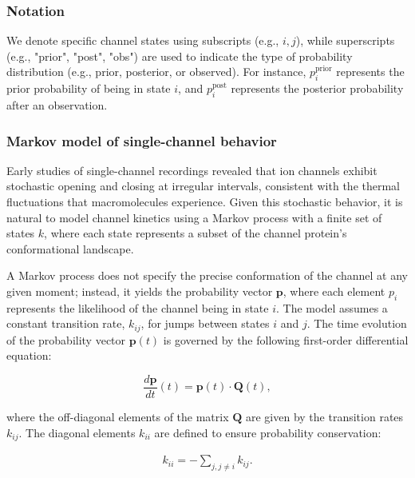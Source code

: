 \documentclass[pdflatex,sn-mathphys-num]{sn-jnl}%
\theoremstyle{thmstyleone}%
\theoremstyle{thmstyletwo}%
\theoremstyle{thmstylethree}%
\begin{document}
\subsubsection{Notation}
We denote specific channel states using subscripts (e.g., \( i, j \)), while superscripts (e.g., "prior", "post", "obs") are used to indicate the type of probability distribution (e.g., prior, posterior, or observed). For instance, \( p_i^{\text{prior}} \) represents the prior probability of being in state \( i \), and \( p_i^{\text{post}} \) represents the posterior probability after an observation.

\subsubsection{Markov model of single-channel behavior}

Early studies of single-channel recordings revealed that ion channels exhibit stochastic opening and closing at irregular intervals, consistent with the thermal fluctuations that macromolecules experience. Given this stochastic behavior, it is natural to model channel kinetics using a Markov process with a finite set of states \( k \), where each state represents a subset of the channel protein’s conformational landscape. 

A Markov process does not specify the precise conformation of the channel at any given moment; instead, it yields the probability vector \( \boldsymbol{p} \), where each element \( p_i \) represents the likelihood of the channel being in state \( i \). The model assumes a constant transition rate, \( k_{ij} \), for jumps between states \( i \) and \( j \). The time evolution of the probability vector \( \boldsymbol{p}(t) \) is governed by the following first-order differential equation:

\begin{equation}
	\frac{d \boldsymbol{p}}{dt}(t) = \boldsymbol{p}(t) \cdot \boldsymbol{Q}(t),
	\label{eq:master_equation}
\end{equation}

where the off-diagonal elements of the matrix \( \boldsymbol{Q} \) are given by the transition rates \( k_{ij} \). The diagonal elements \( k_{ii} \) are defined to ensure probability conservation:

\begin{align}
	k_{ii} = -\sum_{j, j \neq i} k_{ij}.
	\label{eq:Q_diagonal_element}
\end{align}
\end{document}
